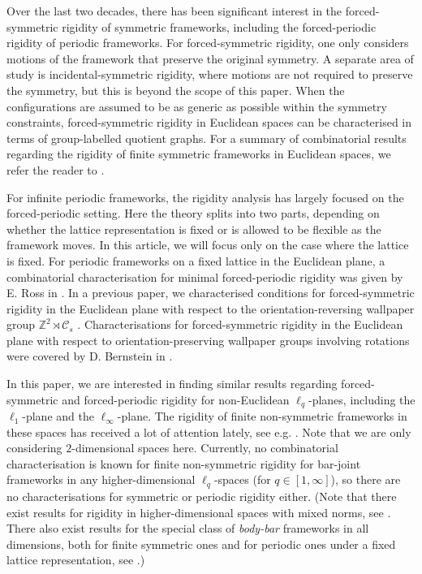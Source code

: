\documentclass[reqno,a4paper,10pt]{article}
\theoremstyle{definition}
\theoremstyle{remark}
\numberwithin{equation}{section}
\numberwithin{figure}{section}
\numberwithin{table}{section}
\newcommand{\Z}{\mathbb{Z}}
\begin{document}
    Over the last two decades, there has been significant interest in the forced-symmetric rigidity of symmetric frameworks, including the forced-periodic rigidity of periodic frameworks. For forced-symmetric rigidity, one only considers motions of the framework that preserve the original symmetry. A separate area of study is incidental-symmetric rigidity, where motions are not required to preserve the symmetry, but this is beyond the scope of this paper. When the configurations are assumed to be as generic as possible within the symmetry constraints, forced-symmetric rigidity in Euclidean spaces can be characterised in terms of  group-labelled quotient graphs. For a summary of combinatorial results regarding the  rigidity of finite symmetric frameworks in Euclidean spaces, we refer the reader to \cite{HandbookDCGsym,constraint19}.
    
    For infinite periodic frameworks,  the rigidity analysis has largely focused on the forced-periodic setting. Here the theory splits into two parts, depending on whether the lattice representation is fixed or is allowed to be flexible as the framework moves. In this article, we will focus only on the case where the lattice is fixed. For periodic frameworks on a fixed lattice in the Euclidean plane, a combinatorial characterisation for minimal forced-periodic rigidity was given by E. Ross in \cite{Inductive}. In a previous paper, we characterised conditions for forced-symmetric rigidity in the Euclidean plane with respect to the orientation-reversing wallpaper group $\Z^2\rtimes\mathcal{C}_s$ \cite{EssonCrystallographic}. Characterisations for forced-symmetric rigidity in the Euclidean plane with respect to orientation-preserving wallpaper groups involving rotations were covered by D. Bernstein in \cite{BernsteinRotations}.

    In this paper, we are interested in finding similar results regarding forced-symmetric and forced-periodic rigidity for non-Euclidean $\ell_q$-planes, including the $\ell_1$-plane and the $\ell_\infty$-plane. The rigidity of finite non-symmetric frameworks in these spaces has received a lot of attention lately, see e.g. \cite{NonEuclidean,KitsonDenseOpen,Dewar,dhn24}. Note that we are only considering $2$-dimensional spaces here. Currently, no combinatorial characterisation is known for finite non-symmetric rigidity for bar-joint frameworks in any higher-dimensional $\ell_q$-spaces (for $q\in[1,\infty]$), so there are no characterisations for symmetric or periodic rigidity either. (Note that there exist results for rigidity in higher-dimensional spaces with mixed norms, see \cite{DewarCylindrical}. There also exist results for the special class of \emph{body-bar} frameworks in all dimensions, both for finite symmetric ones and for periodic ones under a fixed lattice representation, see \cite{TanigawaBodyBar}.)
    
\end{document}
